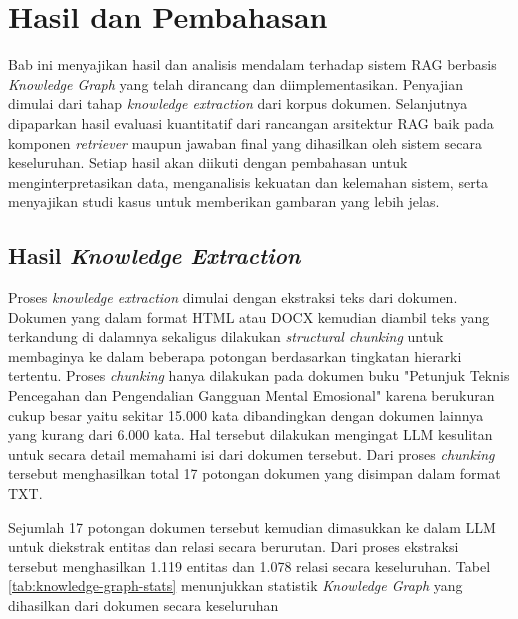 \chapter{Hasil dan Pembahasan}

Bab ini menyajikan hasil dan analisis mendalam terhadap sistem RAG berbasis \textit{Knowledge Graph} yang telah dirancang dan diimplementasikan.
Penyajian dimulai dari tahap \textit{knowledge extraction} dari korpus dokumen.
Selanjutnya dipaparkan hasil evaluasi kuantitatif dari rancangan arsitektur RAG baik pada komponen \textit{retriever} maupun jawaban final yang dihasilkan oleh sistem secara keseluruhan.
Setiap hasil akan diikuti dengan pembahasan untuk menginterpretasikan data, menganalisis kekuatan dan kelemahan sistem, serta menyajikan studi kasus untuk memberikan gambaran yang lebih jelas.

\section{Hasil \textit{Knowledge Extraction}}
Proses \textit{knowledge extraction} dimulai dengan ekstraksi teks dari dokumen.
Dokumen yang dalam format HTML atau DOCX kemudian diambil teks yang terkandung di dalamnya sekaligus dilakukan \textit{structural chunking} untuk membaginya ke dalam beberapa potongan berdasarkan tingkatan hierarki tertentu.
Proses \textit{chunking} hanya dilakukan pada dokumen buku "Petunjuk Teknis Pencegahan dan Pengendalian Gangguan Mental Emosional" karena berukuran cukup besar yaitu sekitar 15.000 kata dibandingkan dengan dokumen lainnya yang kurang dari 6.000 kata.
Hal tersebut dilakukan mengingat LLM kesulitan untuk secara detail memahami isi dari dokumen tersebut.
Dari proses \textit{chunking} tersebut menghasilkan total 17 potongan dokumen yang disimpan dalam format TXT.

Sejumlah 17 potongan dokumen tersebut kemudian dimasukkan ke dalam LLM untuk diekstrak entitas dan relasi secara berurutan.
Dari proses ekstraksi tersebut menghasilkan 1.119 entitas dan 1.078 relasi secara keseluruhan.
Tabel \ref{tab:knowledge-graph-stats} menunjukkan statistik \textit{Knowledge Graph} yang dihasilkan dari dokumen secara keseluruhan

